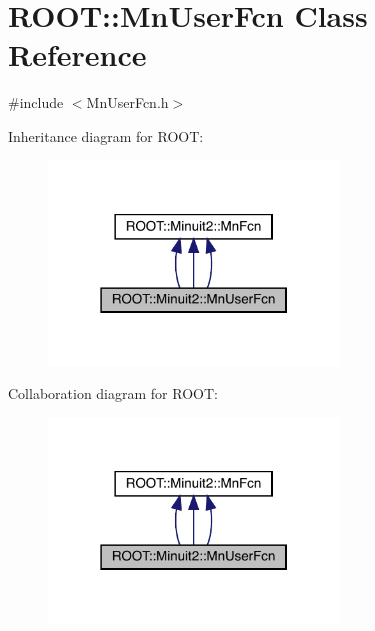 \hypertarget{classROOT_1_1Minuit2_1_1MnUserFcn}{}\section{R\+O\+OT\+:\+:Mn\+User\+Fcn Class Reference}
\label{classROOT_1_1Minuit2_1_1MnUserFcn}


{\ttfamily \#include $<$Mn\+User\+Fcn.\+h$>$}



Inheritance diagram for R\+O\+OT\+:
\nopagebreak
\begin{figure}[H]
\begin{center}
\leavevmode
\includegraphics[width=219pt]{df/d87/classROOT_1_1Minuit2_1_1MnUserFcn__inherit__graph}
\end{center}
\end{figure}


Collaboration diagram for R\+O\+OT\+:
\nopagebreak
\begin{figure}[H]
\begin{center}
\leavevmode
\includegraphics[width=219pt]{da/dda/classROOT_1_1Minuit2_1_1MnUserFcn__coll__graph}
\end{center}
\end{figure}
